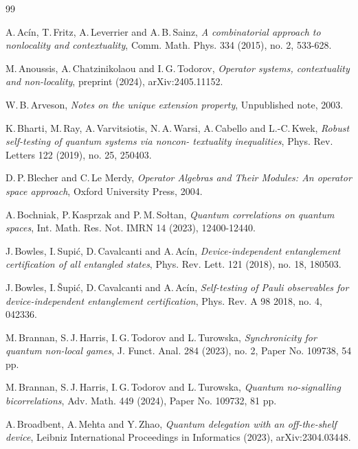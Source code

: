 \documentclass[11pt]{amsart}
\theoremstyle{definition}
\begin{document}
\begin{thebibliography}{99}

{\sc A.\,Ac\'in, T.\,Fritz, A.\,Leverrier and A.\,B.\,Sainz},
{\it A combinatorial approach to nonlocality and contextuality},
{\rm Comm. Math. Phys. 334 (2015), no. 2, 533-628}.

{\sc M.\,Anoussis, A.\,Chatzinikolaou and I.\,G.\,Todorov},
{\it Operator systems, contextuality and non-locality},
{\rm preprint (2024), arXiv:2405.11152}.

{\sc W.\,B.\,Arveson}, 
{\it Notes on the unique extension property},
{\rm Unpublished note, 2003}.

{\sc K.\,Bharti, M.\,Ray, A.\,Varvitsiotis, N.\,A.\,Warsi, A.\,Cabello and L.-C.\,Kwek}, 
{\it Robust self-testing of quantum systems via noncon- textuality inequalities}, 
{\rm Phys. Rev. Letters 122 (2019), no. 25, 250403}.

{\sc D.\,P.\,Blecher and C.\,Le Merdy},
{\em Operator Algebras and Their Modules: An operator space approach},
{\rm Oxford University Press, 2004}.

{\sc A.\,Bochniak, P.\,Kasprzak and P.\,M.\,So\l tan},
{\it Quantum correlations on quantum spaces}, {\rm  Int. Math. Res. Not. IMRN 14 (2023), 12400-12440}.


{\sc J.\,Bowles, I.\,Supi\'c, D.\,Cavalcanti and 
A.\,Ac\'in}, 
{\it Device-independent entanglement certification of all entangled states}, 
{\rm Phys. Rev. Lett. 121 (2018), no. 18, 180503}.


{\sc J.\,Bowles, I.\,\v Supi\'c, D.\,Cavalcanti and 
A.\,Ac\'in}, 
{\it Self-testing of Pauli observables for device-independent entanglement certification}, 
{\rm Phys. Rev. A 98 2018, no. 4, 042336}.



{\sc M.\,Brannan, S.\,J.\,Harris, I.\,G.\,Todorov and L.\,Turowska}, 
{\it Synchronicity for quantum non-local games},
{\rm J. Funct. Anal. 284 (2023), no. 2, Paper No. 109738, 54 pp.}

{\sc M.\,Brannan, S.\,J.\,Harris, I.\,G.\,Todorov and L.\,Turowska}, 
{\it Quantum no-signalling bicorrelations},
{\rm Adv. Math. 449 (2024), Paper No. 109732, 81 pp.}


{\sc A.\,Broadbent, A.\,Mehta and Y.\,Zhao}, 
{\it Quantum delegation with an off-the-shelf device},
{\rm Leibniz International Proceedings in Informatics (2023), arXiv:2304.03448}.


\end{thebibliography}
\end{document}
